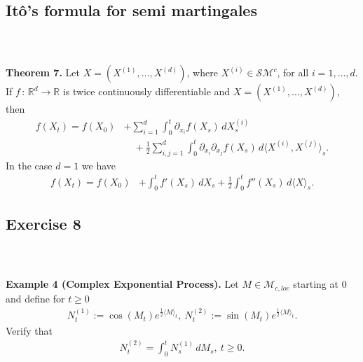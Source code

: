 \documentclass{beamer}
\numberwithin{equation}{section}
\newenvironment{frame2}{\begin{frame}\frametitle{{\normalsize \secname} \\ {\large \subsecname}}}{\end{frame}}
\begin{document}
\subsection{Itô's formula for semi martingales}

\begin{frame2}
    \textbf{Theorem 7.}
        Let $X = (X^{(1)},\ldots,X^{(d)})$, where $X^{(i)} \in \mathcal{SM}^c$, for all $i = 1,\ldots,d$.
        If $f \, : \, \mathbb{R}^d \rightarrow \mathbb{R}$ is twice continuously differentiable and $X = (X^{(1)},\ldots,X^{(d)})$, then
        \begin{align*}
            f(X_t) = f(X_0) &+ \sum_{i = 1}^d\int_0^t\partial_{x_i}f(X_s)\, dX_s^{(i)} \\
            &\quad+ \frac{1}{2}\sum_{i,j=1}^d\int_0^t\partial_{x_i}\partial_{x_j}f(X_s)\, d \langle X^{(i)},X^{(j)}\rangle_s.
        \end{align*}
        In the case $d = 1$ we have
        \begin{align*}
            f(X_t) = f(X_0) &+ \int_0^t f'(X_s)\, dX_s + \frac{1}{2}\int_0^t f''(X_s)\, d \langle X \rangle_s.
        \end{align*}
\end{frame2}

\subsection{Exercise 8}

\begin{frame2}
    \textbf{Example 4 (Complex Exponential Process).}
    Let $M \in \mathcal{M}_{c,loc}$ starting at 0 and define for $t \geq 0$
    \begin{align}
        N_t^{(1)} := \cos(M_t)e^{\frac{1}{2}\langle M \rangle_t},\ N_t^{(2)} := \sin(M_t)e^{\frac{1}{2}\langle M \rangle_t}.
    \end{align}
    Verify that
    \begin{align}
        N_t^{(2)} = \int_0^t N_s^{(1)} \, dM_s, \ t \geq 0.
    \end{align}
\end{frame2}
\end{document}
